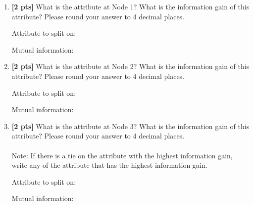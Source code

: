 \begin{enumerate}
\begin{enumerate}[label=(\roman*)]
\newpage

\item \textbf{[2 pts]} What is the attribute at Node 1? What is the information gain of this attribute? Please round your answer to 4 decimal places.

Attribute to split on: \begin{tcolorbox}[fit,height=1.2cm, width=3.5cm, blank, borderline={1pt}{-2pt}, nobeforeafter, box align = center] \end{tcolorbox}
\hspace{0.5cm} Mutual information: \begin{tcolorbox}[fit,height=1.2cm, width=3.5cm, blank, borderline={1pt}{-2pt}, nobeforeafter, box align = center] \end{tcolorbox} 
 
    
\item \textbf{[2 pts]} What is the attribute at Node 2? What is the information gain of this attribute? Please round your answer to 4 decimal places.

Attribute to split on: \begin{tcolorbox}[fit,height=1.2cm, width=3.5cm, blank, borderline={1pt}{-2pt}, nobeforeafter, box align = center] \end{tcolorbox}
\hspace{0.5cm} Mutual information: \begin{tcolorbox}[fit,height=1.2cm, width=3.5cm, blank, borderline={1pt}{-2pt}, nobeforeafter, box align = center] \end{tcolorbox} 



\item \textbf{[2 pts]} What is the attribute at Node 3? What is the information gain of this attribute? Please round your answer to 4 decimal places. \\
\\
Note: If there is a tie on the attribute with the highest information gain, write any of the attribute that has the highest information gain.

Attribute to split on: \begin{tcolorbox}[fit,height=1.2cm, width=3.5cm, blank, borderline={1pt}{-2pt}, nobeforeafter, box align = center] \end{tcolorbox}
\hspace{0.5cm} Mutual information: \begin{tcolorbox}[fit,height=1.2cm, width=3.5cm, blank, borderline={1pt}{-2pt}, nobeforeafter, box align = center] \end{tcolorbox} 



\end{enumerate}
\end{enumerate}
